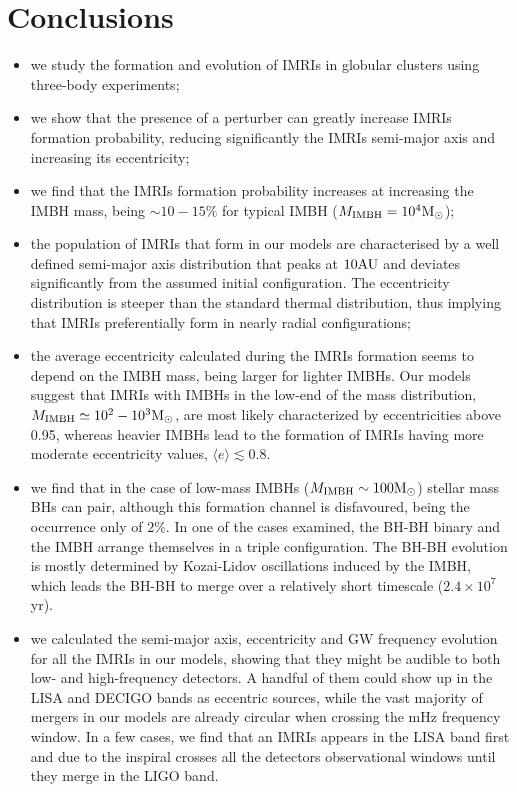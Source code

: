 \documentclass[twocolumn]{aastex62}
\newcommand{\Ms}{{\rm M}_\odot}
\newcommand{\au}{{\rm AU}}
\newcommand{\ibh}{{\rm IMBH}}
\begin{document}
\section{Conclusions}
\begin{itemize}

\item we study the formation and evolution of IMRIs in globular clusters using three-body experiments;
\item we show that the presence of a perturber can greatly increase IMRIs formation probability, reducing significantly the IMRIs semi-major axis and increasing its eccentricity;
\item we find that the IMRIs formation probability increases at increasing the IMBH mass, being $\sim 10-15\%$ for typical IMBH ($M_\ibh = 10^4\Ms$);
\item the population of IMRIs that form in our models are characterised by a well defined semi-major axis distribution that peaks at $10\au$ and deviates significantly from the assumed initial configuration. The eccentricity distribution is steeper than the standard thermal distribution, thus implying that IMRIs preferentially form in nearly radial configurations;
\item the average eccentricity calculated during the IMRIs formation seems to depend on the IMBH mass, being larger for lighter IMBHs. Our models suggest that IMRIs with IMBHs in the low-end of the mass distribution, $M_\ibh \simeq 10^2-10^3\Ms$, are most likely characterized by eccentricities above 0.95, whereas heavier IMBHs lead to the formation of IMRIs having more moderate eccentricity values, $\langle e\rangle \lesssim 0.8$.
\item we find that in the case of low-mass IMBHs ($M_\ibh \sim 100\Ms$) stellar mass BHs can pair, although this formation channel is disfavoured, being the occurrence only of $2\%$. In one of the cases examined, the BH-BH binary and the IMBH arrange themselves in a triple configuration. The BH-BH evolution is mostly determined by Kozai-Lidov oscillations induced by the IMBH, which leads the BH-BH to merge over a relatively short timescale ($2.4\times 10^7$ yr).
\item we calculated the semi-major axis, eccentricity and GW frequency evolution for all the IMRIs in our models, showing that they might be audible to both low- and high-frequency detectors. A handful of them could show up in the LISA and DECIGO bands as eccentric sources, while the vast majority of mergers in our models are already circular when crossing the mHz frequency window. In a few cases, we find that an IMRIs appears in the LISA band first and due to the inspiral crosses all the detectors observational windows until they merge in the LIGO band.  

\end{itemize}
\end{document}

